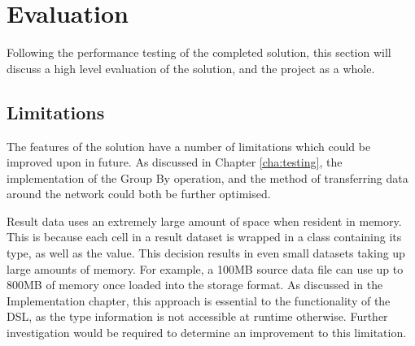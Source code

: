\chapter{Evaluation}\label{cha:evaluation}
Following the performance testing of the completed solution, this section will discuss a high level evaluation of the solution, and the project as a whole.

\section{Limitations}
The features of the solution have a number of limitations which could be improved upon in future. As discussed in Chapter \ref{cha:testing}, the implementation of the Group By operation, and the method of transferring data around the network could both be further optimised.



Result data uses an extremely large amount of space when resident in memory. This is because each cell in a result dataset is wrapped in a class containing its type, as well as the value. This decision results in even small datasets taking up large amounts of memory. For example, a 100MB source data file can use up to 800MB of memory once loaded into the storage format. As discussed in the Implementation chapter, this approach is essential to the functionality of the DSL, as the type information is not accessible at runtime otherwise. Further investigation would be required to determine an improvement to this limitation.

